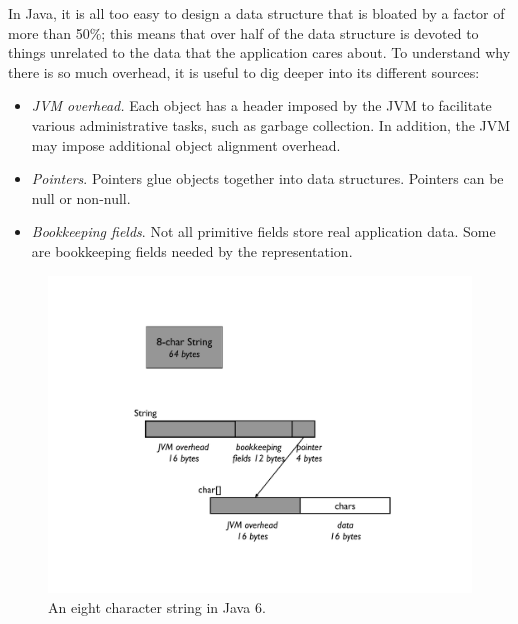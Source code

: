 In Java, it is all too easy to design a data structure that is bloated by a factor of more than 50\%; this means that over half of the data structure is devoted to things unrelated to the data that the application cares about. To understand why there is so much overhead, it is useful to dig deeper into its different sources:  
\begin{itemize}
\item \emph{JVM overhead.} Each object has a header imposed by the JVM to facilitate various administrative tasks, such as garbage collection. In addition, the JVM may impose additional object alignment overhead.
\item \emph{Pointers}. Pointers glue objects together into data structures. Pointers can be null or non-null.   
\item \emph{Bookkeeping fields}. Not all primitive fields store real application data. Some are bookkeeping fields needed by the representation. 
\end{itemize}


\begin{figure}
  \centering
  \includegraphics[width=.70\textwidth]{Figures/chapter3/eight-char-string.pdf}
  \caption{An eight character string in Java 6.}
  \label{fig:eight-char-string}
\end{figure}

